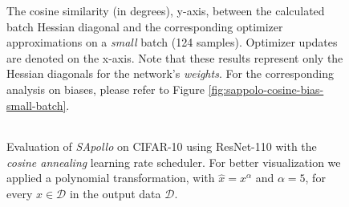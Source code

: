         \begin{figure}[h!]
            \centering
            \begin{tabular}{cc}
                 \\ %
            \end{tabular}
            \caption{The cosine similarity (in degrees), y-axis, between the calculated batch Hessian diagonal and the corresponding optimizer approximations on a \emph{small} batch (124 samples).
            Optimizer updates are denoted on the x-axis.
            Note that these results represent only the Hessian diagonals for the network's \emph{weights}. For the corresponding analysis on biases, please refer to Figure \ref{fig:sappolo-cosine-bias-small-batch}.
        }
            \label{fig:sapollo-approx-weights}
        \end{figure}

        \begin{figure}[h!]
            \centering
            \begin{tabular}{cc}
                 \\ %
            \end{tabular}
            \caption{
               Evaluation of \emph{SApollo} on CIFAR-10 using ResNet-110 with the \emph{cosine annealing} learning rate scheduler. For better visualization we applied a polynomial transformation, with $\hat{x}=x^\alpha$ and $\alpha=5$, for every $x \in \mathcal{D}$ in the output data $ \mathcal{D}$. 
        }
        \label{fig:sapollo-perf}

        \end{figure}